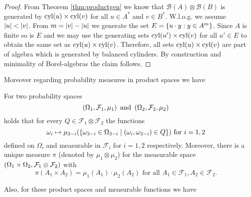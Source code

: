 \begin{proof}
  From Theorem \ref{thm:productgen} we know that
  $\mathcal{B}(A)\otimes\mathcal{B}(B)$ is generated by $\operatorname{cyl}(u)\times\operatorname{cyl}(v)$
  for all $u\in A^{*}$ and $v\in B^{*}$.
  W.l.o.g. we assume $\left\vert{u}\right\vert < \left\vert{v}\right\vert$. From $m = \left\vert{v}\right\vert - \left\vert{u}\right\vert$ we
  generate the set $E = \left\{u\cdot y:y\in A^{m}\right\}$. Since $A$ is finite so is
  $E$ and we may use the generating sets $\operatorname{cyl}(u')\times\operatorname{cyl}(v)$ for all
  $u'\in E$ to obtain the same set as $\operatorname{cyl}(u)\times\operatorname{cyl}(v)$. Therefore, all
  sets $\operatorname{cyl}(u)\times\operatorname{cyl}(v)$ are part of algebra which is generated by
  balanced cylinders. By construction and minimality of Borel-algebras the
  claim follows.
\end{proof}

Moreover regarding probability measures in product spaces we have
\begin{lemma}
  \cite[Lemma 23.2, Theorem 23.3]{Bauer}
  For two probability spaces 
  \begin{equation*}
    \left(\Omega_{1}, \mathcal{F}_{1}, \mu_{1}\right)\text{ and }
    \left(\Omega_{2}, \mathcal{F}_{2}, \mu_{2}\right)
  \end{equation*}
  holds that for every $Q\in\mathcal{F}_{1}\otimes\mathcal{F}_{2}$ the 
  functions
  \begin{equation*}
    \omega_{i}\mapsto\mu_{3-i}(\left\{\omega_{3-i}\in\Omega_{3-i}\mid
      \left(\omega_{i}, \omega_{3-i}\right)\in Q\right\})
    \text{ for }i = 1,2
  \end{equation*}
  defined on $\Omega_{i}$ and measurable in $\mathcal{F}_{i}$ for $i = 1,2$
  respectively. Moreover, there is a unique measure $\pi$ (denoted by 
  $\mu_{1}\otimes\mu_{2}$) for the measurable space 
  $\left(\Omega_{1}\times\Omega_{2}, \mathcal{F}_{1}\otimes\mathcal{F}_{2}\right)$ 
  with 
  \begin{equation*}
    \pi(A_{1}\times A_{2}) = \mu_{1}(A_{1})\cdot\mu_{2}(A_{2})\text{ for all }
      A_{1}\in\mathcal{F}_{1}, A_{2}\in\mathcal{F}_{2}.
  \end{equation*}
  \label{lem:productmeasure}
\end{lemma} 
Also, for these product spaces and measurable functions we have
